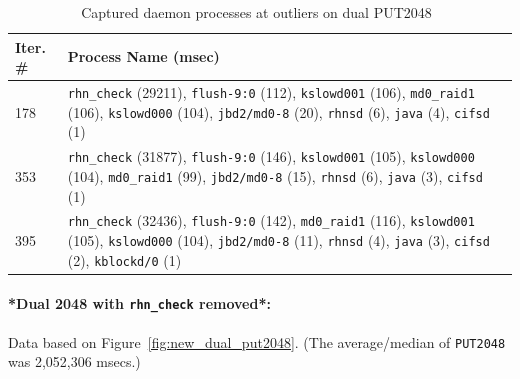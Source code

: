 \documentclass[10pt]{article}
\begin{document}
\begin{table}[htp!]
\centering
{
 \begin{tabular}{|p{2cm}|p{8cm}|} \hline
Iter. \# & Process Name (msec)\\ \hline
178 & {\tt rhn\_check} (29211), {\tt flush-9:0} (112), {\tt kslowd001} (106),  {\tt md0\_raid1} (106), 
{\tt kslowd000} (104), {\tt jbd2/md0-8} (20), {\tt rhnsd} (6),  {\tt java} (4), {\tt cifsd} (1)\\ \hline
353 & {\tt rhn\_check} (31877), {\tt flush-9:0} (146), {\tt kslowd001} (105),  {\tt kslowd000} (104), 
{\tt md0\_raid1} (99), {\tt jbd2/md0-8} (15), {\tt rhnsd} (6),  {\tt java} (3), {\tt cifsd} (1)\\ \hline
395 & {\tt rhn\_check} (32436), {\tt flush-9:0} (142), {\tt md0\_raid1} (116), 
{\tt kslowd001} (105),  {\tt kslowd000} (104), {\tt jbd2/md0-8} (11), {\tt rhnsd} (4),  {\tt java} (3), 
{\tt cifsd} (2), {\tt kblockd/0} (1) \\ \hline
  \end{tabular}
  }
 \caption{Captured daemon processes at outliers on dual PUT2048~\label{fig:dual_put2048_procs}}
\end{table}

\clearpage
\newpage

\paragraph{*Dual 2048 with {\tt rhn\_check} removed*:} Data based on Figure~\ref{fig:new_dual_put2048}.
(The average/median of {\tt PUT2048} was 2,052,306 msecs.)
\end{document}
